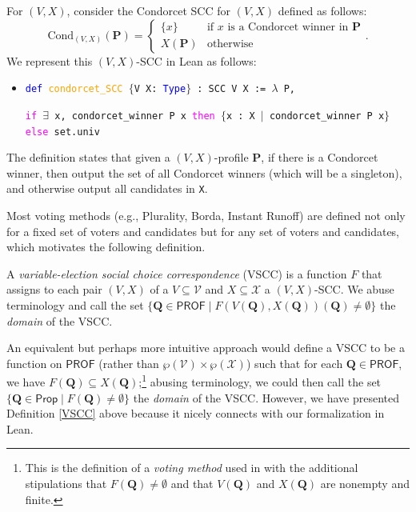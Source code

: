\documentclass[runningheads]{llncs}
\begin{document}
\begin{example}\label{CondorcetEx1} For $(V,X)$, consider the Condorcet SCC for $(V,X)$ defined as follows:
\[\mathrm{Cond}_{(V,X)}(\mathbf{P})=\begin{cases} \{x\} & \mbox{if $x$ is a Condorcet winner in $\mathbf{P}$} \\ X(\mathbf{P}) & \mbox{otherwise}\end{cases}.\]
We represent this $(V,X)$-SCC in Lean as follows:
\begin{itemize}
\item[] \texttt{\textcolor{blue}{def} \textcolor{orange}{condorcet\_SCC} $\{$V X: \textcolor{blue}{Type}$\}$ : SCC V X := $\lambda$ P, }

\texttt{\textcolor{magenta}{if} $\exists$ x, condorcet\_winner P x \textcolor{magenta}{then} $\{$x : X $\mid$ condorcet\_winner P x$\}$} \\
\texttt{\textcolor{magenta}{else} set.univ}
\end{itemize}
The definition states that given a $(V,X)$-profile $\mathbf{P}$, if there is a Condorcet winner, then output the set of all Condorcet winners (which will be a singleton), and otherwise output all candidates in \texttt{X}.
\end{example}

Most voting methods (e.g., Plurality, Borda, Instant Runoff) are defined not only for a fixed set of voters and candidates but for any set of voters and candidates, which motivates the following definition.

\begin{definition}\label{VSCC} \textnormal{A \textit{variable-election social choice correspondence} (VSCC) is a function $F$ that assigns to each pair $(V,X)$ of a $V\subseteq \mathcal{V}$ and $X\subseteq\mathcal{X}$ a $(V,X)$-SCC. We abuse terminology and call the set $\{\mathbf{Q}\in\mathsf{PROF}\mid F(V(\mathbf{Q}),X(\mathbf{Q}))(\mathbf{Q})\neq\emptyset \}$ the \textit{domain} of the VSCC.}
\end{definition}

\noindent An equivalent but perhaps more intuitive approach would define a VSCC to be a function on $\mathsf{PROF}$ (rather than $\wp(\mathcal{V})\times\wp(\mathcal{X})$) such that for each $\mathbf{Q}\in\mathsf{PROF}$, we have $F(\mathbf{Q})\subseteq X(\mathbf{Q})$;\footnote{This is the definition of a \textit{voting method} used in \cite{} with the additional stipulations that $F(\mathbf{Q})\neq\emptyset$ and  that $V(\mathbf{Q})$ and $X(\mathbf{Q})$ are nonempty and finite.} abusing terminology, we could then call the set $\{\mathbf{Q}\in\mathsf{Prop}\mid F(\mathbf{Q})\neq\emptyset\}$ the \emph{domain} of the VSCC. However, we have presented Definition \ref{VSCC} above because it nicely connects with our formalization in Lean.
\end{document}
